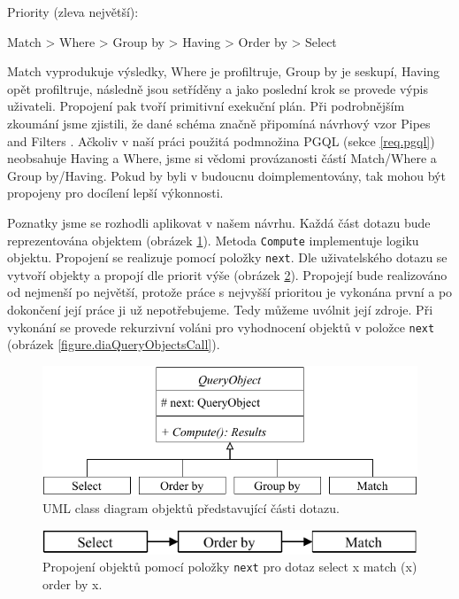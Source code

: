 Priority (zleva největší):
\begin{code}
      Match > Where > Group by > Having > Order by > Select 
\end{code}
Match vyprodukuje výsledky, Where je profiltruje, Group by je seskupí, Having opět profiltruje, následně jsou setříděny a jako poslední krok se provede výpis uživateli.
Propojení pak tvoří primitivní exekuční plán.
Při podrobnějším zkoumání jsme zjistili, že dané schéma značně připomíná návrhový vzor Pipes and Filters \citep[str. 53]{patterns2}.
Ačkoliv v naší práci použitá podmnožina PGQL (sekce \ref{req.pgql}) neobsahuje Having a Where, jsme si vědomi provázanosti částí Match/Where a Group by/Having.
Pokud by byli v budoucnu doimplementovány, tak mohou být propojeny pro docílení lepší výkonnosti. 

Poznatky jsme se rozhodli aplikovat v našem návrhu.
Každá část dotazu bude reprezentována objektem (obrázek \ref{figure.diaQueryObjects}).
Metoda \verb+Compute+ implementuje logiku objektu.
Propojení se realizuje pomocí položky \verb+next+.
Dle uživatelského dotazu se vytvoří objekty a propojí dle priorit výše (obrázek \ref{figure.diaQueryObjectsCon}).
Propojejí bude realizováno od nejmenší po největší, protože práce s nejvyšší prioritou je vykonána první a po dokončení její práce ji už nepotřebujeme.
Tedy můžeme uvólnit její zdroje.
Při vykonání se provede rekurzivní voláni pro vyhodnocení objektů v položce \verb+next+ (obrázek \ref{figure.diaQueryObjectsCall}). 

\begin{figure}[!htp]
\includegraphics{../img/diaQueryObjects.pdf}\centering
\caption{UML class diagram objektů představující části dotazu.}
\label{figure.diaQueryObjects}
\end{figure}

\clearpage

\begin{figure}[!htp]
\includegraphics{../img/diaQueryObjectsCon.pdf}\centering
\caption{Propojení objektů pomocí položky \texttt{next} pro dotaz select x match (x) order by x.}
\label{figure.diaQueryObjectsCon}
\end{figure}

